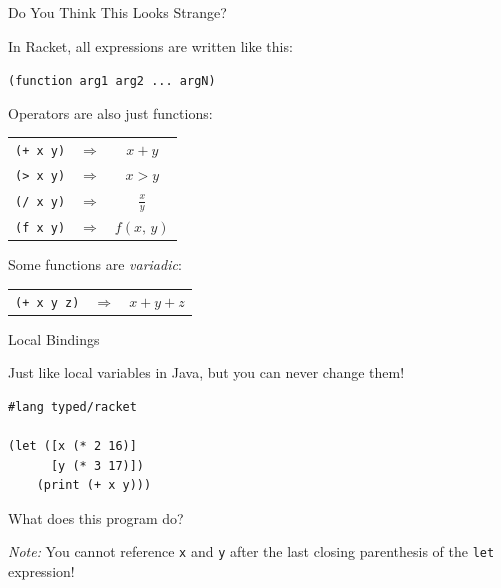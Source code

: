 \documentclass{beamer}
\begin{document}
\begin{frame}[fragile]{Do You Think This Looks Strange?}

  In Racket, all expressions are written like this:

  \begin{center}
    \lstinline{(function arg1 arg2 ... argN)}
  \end{center}

  \pause{}

  Operators are also just functions:

  \begin{center}
    \begin{tabular}{ccc}
      \lstinline{(+ x y)} & $\Rightarrow$ & $x + y$ \\
      \lstinline{(> x y)} & $\Rightarrow$ & $x > y$ \\
      \lstinline{(/ x y)} & $\Rightarrow$ & $\frac{x}{y}$ \\
      \lstinline{(f x y)} & $\Rightarrow$ & $f(x, \, y)$
    \end{tabular}
  \end{center}

  \pause{}

  Some functions are \textit{variadic}:

  \begin{center}
    \begin{tabular}{ccc}
      \lstinline{(+ x y z)} & $\Rightarrow$ & $x + y + z$
    \end{tabular}
  \end{center}

\end{frame}

\begin{frame}[fragile]{Local Bindings}

Just like local variables in Java, but you can never change them!

\begin{lstlisting}
#lang typed/racket

(let ([x (* 2 16)]
      [y (* 3 17)])
    (print (+ x y)))
\end{lstlisting}

What does this program do?

\vspace{1cm}

\textit{Note:} You cannot reference \lstinline{x} and \lstinline{y} after the last closing parenthesis of the \lstinline{let} expression!

\end{frame}
\end{document}
